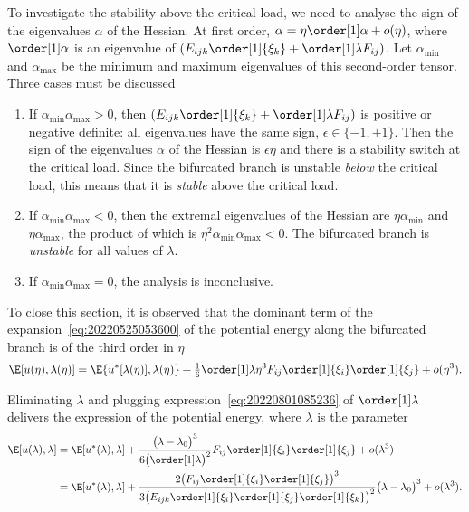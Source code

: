 To investigate the stability above the critical load, we need to analyse the sign of the eigenvalues $\alpha$ of the
Hessian. At first order, $\alpha = \eta \order[1]\alpha + o(\eta)$, where $\order[1]\alpha$ is an eigenvalue of
$(E_{ijk} \order[1]{\xi_k} + \order[1]\lambda F_{ij})$. Let $\alpha_{\min}$ and $\alpha_{\max}$ be the minimum and
maximum eigenvalues of this second-order tensor. Three cases must be discussed
\begin{enumerate}
\item If $\alpha_{\min} \alpha_{\max} > 0$, then $(E_{ijk} \order[1]{\xi_k} + \order[1]\lambda F_{ij})$ is positive or
  negative definite: all eigenvalues have the same sign, $\epsilon \in \{-1, +1\}$. Then the sign of the eigenvalues
  $\alpha$ of the Hessian is $\epsilon \eta$ and there is a stability switch at the critical load. Since the bifurcated
  branch is unstable \emph{below} the critical load, this means that it is \emph{stable} above the critical load.
\item If $\alpha_{\min} \alpha_{\max} < 0$, then the extremal eigenvalues of the Hessian are $\eta \alpha_{\min}$ and
  $\eta \alpha_{\max}$, the product of which is $\eta^2 \alpha_{\min} \alpha_{\max} < 0$. The bifurcated branch is
  \emph{unstable} for all values of $\lambda$.
\item If $\alpha_{\min} \alpha_{\max} = 0$, the analysis is inconclusive.
\end{enumerate}

To close this section, it is observed that the dominant term of the expansion~\eqref{eq:20220525053600} of the potential
energy along the bifurcated branch is of the third order in $\eta$
\begin{equation}
  \E[u(\eta), \lambda(\eta)] = \E\{u^{\ast}[\lambda(\eta)], \lambda(\eta)\} + \tfrac{1}{6} \order[1]\lambda \eta^3 F_{i j} \order[1]{\xi_i} \order[1]{\xi_j} + o(\eta^3).
\end{equation}

Eliminating $\lambda$ and plugging expression~\eqref{eq:20220801085236} of $\order[1]\lambda$ delivers the expression of
the potential energy, where $\lambda$ is the parameter
\begin{equation}
  \begin{aligned}[b]
    \E[u(\lambda), \lambda] &= \E[u^{\ast}(\lambda), \lambda] + \frac{\bigl(\lambda - \lambda_0\bigr)^3}{6\bigl( \order[1]\lambda \bigr)^2} F_{i j} \order[1]{\xi_i} \order[1]{\xi_j} + o(\lambda^3)\\
    &= \E[u^{\ast}(\lambda), \lambda] + \frac{2 \bigl( F_{i j} \order[1]{\xi_i} \order[1]{\xi_j} \bigr)^3}{3 \bigl( E_{ijk} \order[1]{\xi_i} \order[1]{\xi_j} \order[1]{\xi_k} \bigr)^2} \bigl(\lambda - \lambda_0\bigr)^3 + o(\lambda^3).
  \end{aligned}
\end{equation}

